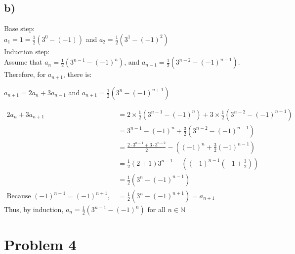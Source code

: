 \documentclass{article}
\begin{document}
    \subsection*{b)}
        Base step:\\
        \(a_1=1=\frac{1}{2} (3^0-(-1))\) and \(a_2=\frac{1}{2} (3^1-(-1)^2)\)\\
        Induction step:\\
        Assume that \(a_n=\frac{1}{2}(3^{n-1}-(-1)^n)\), and \(a_{n-1}=\frac{1}{2}(3^{n-2}-(-1)^{n-1})\).\\
        Therefore, for \(a_{n+1}\), there is:\\
        \begin{center}
            \(a_{n+1}=2a_n+3a_{n-1}\) and \(a_{n+1}=\frac{1}{2}(3^{n}-(-1)^{n+1})\)
        \end{center}
        \begin{align*}
            2a_n+3a_{n+1}&=2\times\frac{1}{2}(3^{n-1}-(-1)^n)+3\times \frac{1}{2}(3^{n-2}-(-1)^{n-1})\\
            &=3^{n-1}-(-1)^n+\frac{3}{2}(3^{n-2}-(-1)^{n-1})\\
            &=\frac{2\cdot 3^{n-1}+3\cdot3^{n-2}}{2}-\left((-1)^{n}+\frac{3}{2}(-1)^{n-1}\right)\\
            &=\frac{1}{2}(2+1)3^{n-1}-((-1)^{n-1}(-1+\frac{3}{2}))\\
            &=\frac{1}{2}(3^n-(-1)^{n-1})\\
            \text{Because }(-1)^{n-1}=(-1)^{n+1}, \ &=\frac{1}{2}(3^n-(-1)^{n+1})=a_{n+1}
        \end{align*}
        Thus, by induction, \(a_n=\frac{1}{2}(3^{n-1}-(-1)^n)\) for all \(n\in \mathbb{N}\)
\section*{Problem 4} 
\end{document}
